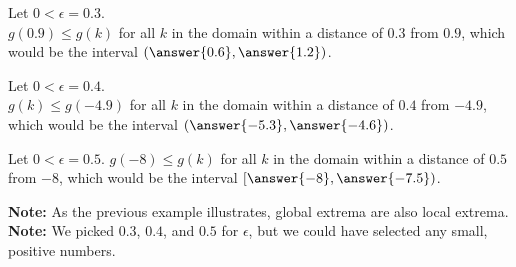 \documentclass{ximera}
\begin{document}
Let $0 < \epsilon = 0.3$.  \\
$g(0.9) \leq g(k)$ for all $k$ in the domain within a distance of $0.3$ from $0.9$, which would be the interval $\left(\answer{0.6}, \answer{1.2}\right)$.

Let $0 < \epsilon = 0.4$.  \\
$g(k) \leq g(-4.9)$ for all $k$ in the domain within a distance of $0.4$ from $-4.9$, which would be the interval $\left(\answer{-5.3}, \answer{-4.6}\right)$.

Let $0 < \epsilon = 0.5$.  $g(-8) \leq g(k)$ for all $k$ in the domain within a distance of $0.5$ from $-8$, which would be the interval $\left[\answer{-8}, \answer{-7.5}\right)$.


\textbf{Note:} As the previous example illustrates, global extrema are also local extrema. \\
\textbf{Note:} We picked $0.3$, $0.4$, and $0.5$ for $\epsilon$, but we could have selected any small, positive numbers.
\end{document}

